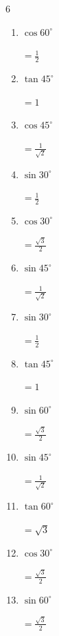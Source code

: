 \begin{multicols}{6}
\begin{enumerate}
\columnbreak %

  \item $\displaystyle \cos{60^\circ}$

        $\displaystyle =\frac{1}{2}$

  \item $\displaystyle \tan{45^\circ}$

        $\displaystyle =1$

  \item $\displaystyle \cos{45^\circ}$

        $\displaystyle =\frac{1}{\sqrt{2}}$

  \item $\displaystyle \sin{30^\circ}$

        $\displaystyle =\frac{1}{2}$

  \item $\displaystyle \cos{30^\circ}$

        $\displaystyle =\frac{\sqrt{3}}{2}$

  \item $\displaystyle \sin{45^\circ}$

        $\displaystyle =\frac{1}{\sqrt{2}}$

  \item $\displaystyle \sin{30^\circ}$

        $\displaystyle =\frac{1}{2}$

  \item $\displaystyle \tan{45^\circ}$

        $\displaystyle =1$

  \item $\displaystyle \sin{60^\circ}$

        $\displaystyle =\frac{\sqrt{3}}{2}$

  \item $\displaystyle \sin{45^\circ}$

        $\displaystyle =\frac{1}{\sqrt{2}}$

  \item $\displaystyle \tan{60^\circ}$

        $\displaystyle =\sqrt{3}$

  \item $\displaystyle \cos{30^\circ}$

        $\displaystyle =\frac{\sqrt{3}}{2}$

  \item $\displaystyle \sin{60^\circ}$

        $\displaystyle =\frac{\sqrt{3}}{2}$


\end{enumerate}
\end{multicols}
